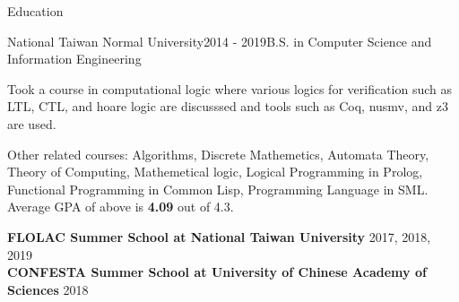 \documentclass{resume} %
\begin{document}

\begin{rSection}{Education}

\begin{rSubsection}{National Taiwan Normal University}{2014 - 2019}{B.S. in Computer Science and Information Engineering}{}
\item Took a course in computational logic where various logics for verification such as LTL, CTL, and hoare logic are discusssed and
tools such as Coq, nusmv, and z3 are used.
\item Other related courses: Algorithms, Discrete Mathemetics, Automata Theory, Theory of Computing, Mathemetical logic, Logical Programming
in Prolog, Functional Programming in Common Lisp, Programming Language in SML.
Average GPA of above is {\bf 4.09} out of 4.3.
\end{rSubsection}

{\bf FLOLAC Summer School at National Taiwan University} \hfill {2017, 2018, 2019} \\
{\bf CONFESTA Summer School at University of Chinese Academy of Sciences} \hfill {2018}

\end{rSection}

\end{document}
